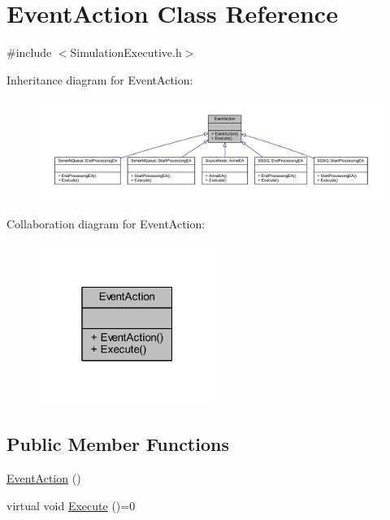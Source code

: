 \hypertarget{class_event_action}{}\section{Event\+Action Class Reference}
\label{class_event_action}


{\ttfamily \#include $<$Simulation\+Executive.\+h$>$}



Inheritance diagram for Event\+Action\+:
\nopagebreak
\begin{figure}[H]
\begin{center}
\leavevmode
\includegraphics[width=350pt]{class_event_action__inherit__graph}
\end{center}
\end{figure}


Collaboration diagram for Event\+Action\+:
\nopagebreak
\begin{figure}[H]
\begin{center}
\leavevmode
\includegraphics[width=163pt]{class_event_action__coll__graph}
\end{center}
\end{figure}
\subsection*{Public Member Functions}
\begin{DoxyCompactItemize}
\item 
\hyperlink{class_event_action_a9a8515b9069293b94b72a6863c48e6ba}{Event\+Action} ()
\item 
virtual void \hyperlink{class_event_action_a62b9d07abb4ca8e7c078b076a1ab1a9f}{Execute} ()=0
\end{DoxyCompactItemize}


